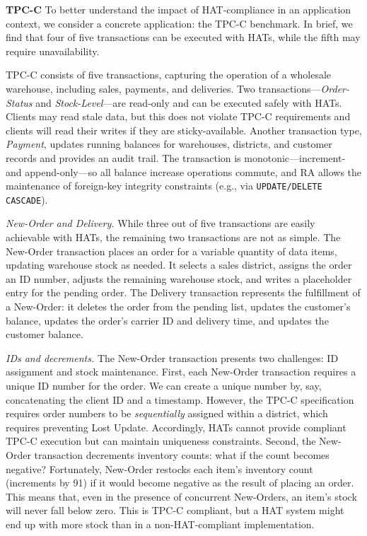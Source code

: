 \vspace{.5em}\noindent\textbf{TPC-C} To better understand the impact
of HAT-compliance in an application context, we consider a concrete
application: the TPC-C benchmark. In brief, we find that four of five
transactions can be executed with HATs, while the fifth may require
unavailability.

TPC-C consists of five transactions, capturing the operation of a
wholesale warehouse, including sales, payments, and deliveries. Two
transactions---\textit{Order-Status} and \textit{Stock-Level}---are
read-only and can be executed safely with HATs. Clients may read stale
data, but this does not violate TPC-C requirements and clients will
read their writes if they are sticky-available. Another transaction
type, \textit{Payment}, updates running balances for warehouses,
districts, and customer records and provides an audit trail. The
transaction is monotonic---increment- and append-only---so all balance
increase operations commute, and RA allows the maintenance of
foreign-key integrity constraints (e.g., via \texttt{UPDATE/DELETE
  CASCADE}).

\vspace{.5em}\noindent\textit{New-Order and Delivery.} While three out of
five transactions are easily achievable with HATs, the remaining two
transactions are not as simple. The New-Order transaction places an
order for a variable quantity of data items, updating warehouse stock
as needed. It selects a sales district, assigns the order an ID
number, adjusts the remaining warehouse stock, and writes a
placeholder entry for the pending order. The Delivery transaction
represents the fulfillment of a New-Order: it deletes the order from
the pending list, updates the customer's balance, updates the order's
carrier ID and delivery time, and updates the customer balance.

\vspace{.5em}\noindent\textit{IDs and decrements.} The New-Order transaction presents two challenges: ID assignment and
stock maintenance. First, each New-Order transaction requires a unique
ID number for the order. We can create a unique number by, say,
concatenating the client ID and a timestamp. However, the TPC-C
specification requires order numbers to be \textit{sequentially}
assigned within a district, which requires preventing Lost
Update. Accordingly, HATs cannot provide compliant TPC-C execution but
can maintain uniqueness constraints. Second, the New-Order
transaction decrements inventory counts: what if the count becomes
negative?  Fortunately, New-Order restocks each item's inventory
count (increments by 91) if it would become negative as the result of
placing an order. This means that, even in the presence of concurrent
New-Orders, an item's stock will never fall below zero. This is TPC-C
compliant, but a HAT system might end up with more stock than in a
non-HAT-compliant implementation.

